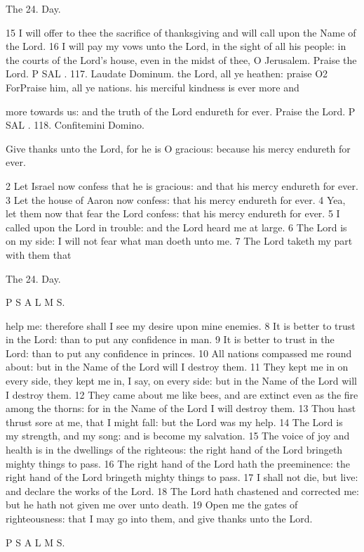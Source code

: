The 24. Day.

15 I will offer to thee the sacrifice of thanksgiving and will call upon the Name of the Lord. 16 I will pay my vows unto the Lord, in the sight of all his people: in the courts of the Lord’s house, even in the midst of thee, O Jerusalem. Praise the Lord. P SAL . 117. Laudate Dominum. the Lord, all ye heathen: praise O2 ForPraise him, all ye nations. his merciful kindness is ever more and

more towards us: and the truth of the Lord endureth for ever. Praise the Lord. P SAL . 118. Confitemini Domino.

Give thanks unto the Lord, for he is O gracious: because his mercy endureth for ever.

2 Let Israel now confess that he is gracious: and that his mercy endureth for ever. 3 Let the house of Aaron now confess: that his mercy endureth for ever. 4 Yea, let them now that fear the Lord confess: that his mercy endureth for ever. 5 I called upon the Lord in trouble: and the Lord heard me at large. 6 The Lord is on my side: I will not fear what man doeth unto me. 7 The Lord taketh my part with them that

The 24. Day.

P S A L M S.

help me: therefore shall I see my desire upon mine enemies. 8 It is better to trust in the Lord: than to put any confidence in man. 9 It is better to trust in the Lord: than to put any confidence in princes. 10 All nations compassed me round about: but in the Name of the Lord will I destroy them. 11 They kept me in on every side, they kept me in, I say, on every side: but in the Name of the Lord will I destroy them. 12 They came about me like bees, and are extinct even as the fire among the thorns: for in the Name of the Lord I will destroy them. 13 Thou hast thrust sore at me, that I might fall: but the Lord was my help. 14 The Lord is my strength, and my song: and is become my salvation. 15 The voice of joy and health is in the dwellings of the righteous: the right hand of the Lord bringeth mighty things to pass. 16 The right hand of the Lord hath the preeminence: the right hand of the Lord bringeth mighty things to pass. 17 I shall not die, but live: and declare the works of the Lord. 18 The Lord hath chastened and corrected me: but he hath not given me over unto death. 19 Open me the gates of righteousness: that I may go into them, and give thanks unto the Lord.

P S A L M S.

